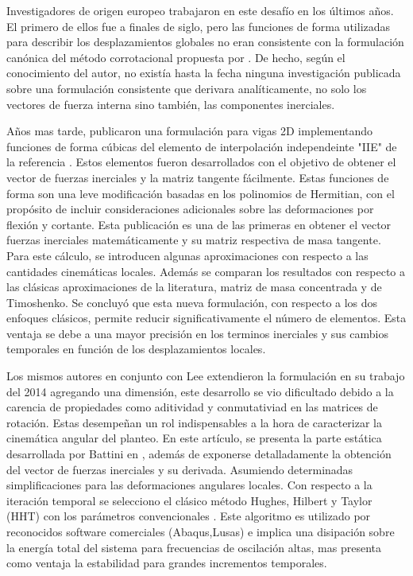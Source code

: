 Investigadores de origen europeo trabajaron en este desafío en los últimos años. El primero de ellos fue \cite{behdinan1998co} a finales de siglo, pero las funciones de forma utilizadas para describir los desplazamientos globales no eran consistente con la formulación canónica del método corrotacional propuesta por \textcite{simo1988dynamics}. De hecho, según el conocimiento del autor, no existía hasta la fecha ninguna investigación publicada sobre una formulación consistente que derivara analíticamente, no solo los vectores de fuerza interna sino también, las componentes inerciales.   

Años mas tarde, \cite{Le2011} publicaron una formulación para vigas 2D implementando funciones de forma cúbicas del elemento de interpolación independeinte "IIE" de la referencia \cite{reddy1997locking}. Estos elementos fueron desarrollados con el objetivo de obtener el vector de fuerzas inerciales y la matriz tangente fácilmente. Estas funciones de forma son una leve modificación basadas en los polinomios de Hermitian, con el propósito de incluir consideraciones adicionales sobre las deformaciones por flexión y cortante. Esta publicación es una de las primeras en obtener el vector fuerzas inerciales matemáticamente y su matriz respectiva de masa tangente. Para este cálculo, se introducen algunas aproximaciones con respecto a las cantidades cinemáticas locales. Además se comparan los resultados con respecto a las clásicas aproximaciones de la literatura, matriz de masa concentrada y de Timoshenko. Se concluyó que esta nueva formulación, con respecto a los dos enfoques clásicos,  permite reducir significativamente el número de elementos. Esta ventaja se debe a una mayor precisión en los terminos inerciales y sus cambios temporales en función de los desplazamientos locales.    

Los mismos autores en conjunto con Lee extendieron la formulación en su trabajo del 2014 \cite{Le2014} agregando una dimensión, este desarrollo se vio dificultado debido a la carencia de propiedades como aditividad y conmutativiad en las matrices de rotación. Estas desempeñan un rol indispensables a la hora de caracterizar la cinemática angular del planteo. En este artículo, se presenta la parte estática desarrollada por Battini en \cite{Battini2002}, además de exponerse detalladamente la obtención del vector de fuerzas inerciales y su derivada. Asumiendo determinadas simplificaciones para las deformaciones angulares locales. Con respecto a la iteración temporal se selecciono el clásico método Hughes, Hilbert y Taylor (HHT) con los parámetros convencionales \citep{hilber1977improved}. Este algoritmo es utilizado por reconocidos software comerciales (Abaqus,Lusas) e implica una disipación sobre la energía total del sistema para frecuencias de oscilación altas, mas presenta como ventaja la estabilidad para grandes incrementos temporales. 

